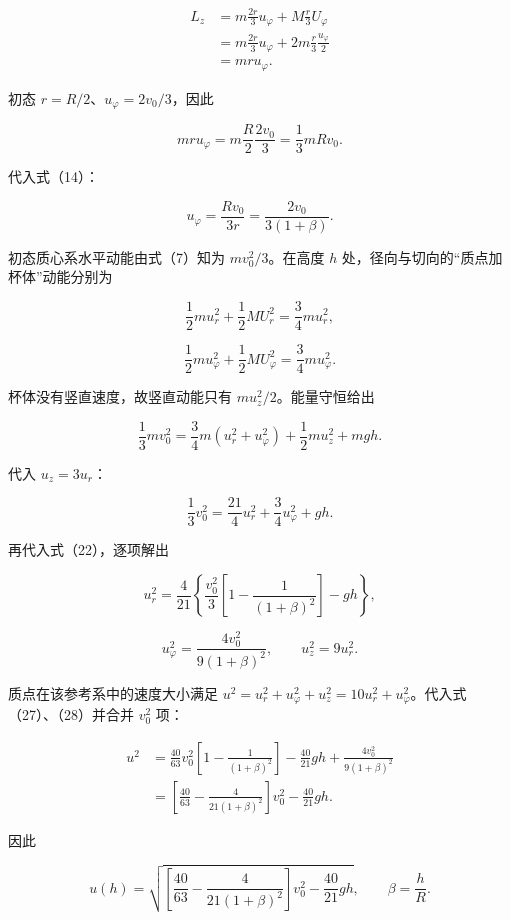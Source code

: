 \documentclass[12pt,a4paper,UTF8]{ctexart}
\begin{document}
\[
\begin{aligned}
L_z
&=m\frac{2r}{3}u_\varphi
+M\frac r3U_\varphi\\
&=m\frac{2r}{3}u_\varphi
+2m\frac r3\frac{u_\varphi}{2}\\
&=mru_\varphi.
\end{aligned}
\tag{20}
\]

初态 \(r=R/2\)、\(u_\varphi=2v_0/3\)，因此

\[
mr u_\varphi
=m\frac R2\frac{2v_0}{3}
=\frac13mRv_0.
\tag{21}
\]

代入式（14）：

\[
\boxed{
u_\varphi
=\frac{Rv_0}{3r}
=\frac{2v_0}{3(1+\beta)}
}.
\tag{22}
\]

初态质心系水平动能由式（7）知为 \(mv_0^2/3\)。在高度 \(h\)
处，径向与切向的``质点加杯体''动能分别为

\[
\frac12m u_r^2+\frac12M U_r^2
=\frac34m u_r^2,
\tag{23}
\]

\[
\frac12m u_\varphi^2+\frac12M U_\varphi^2
=\frac34m u_\varphi^2.
\tag{24}
\]

杯体没有竖直速度，故竖直动能只有 \(m u_z^2/2\)。能量守恒给出

\[
\frac13m v_0^2
=\frac34m(u_r^2+u_\varphi^2)
+\frac12m u_z^2+mgh.
\tag{25}
\]

代入 \(u_z=3u_r\)：

\[
\frac13v_0^2
=\frac{21}{4}u_r^2
+\frac34u_\varphi^2+gh.
\tag{26}
\]

再代入式（22），逐项解出

\[
\boxed{
u_r^2
=\frac4{21}\left\{
\frac{v_0^2}{3}\left[1-\frac1{(1+\beta)^2}\right]-gh
\right\}
},
\tag{27}
\]

\[
\boxed{
u_\varphi^2=\frac{4v_0^2}{9(1+\beta)^2}
},
\qquad
\boxed{u_z^2=9u_r^2}.
\tag{28}
\]

质点在该参考系中的速度大小满足
\(u^2=u_r^2+u_\varphi^2+u_z^2=10u_r^2+u_\varphi^2\)。代入式（27）、（28）并合并
\(v_0^2\) 项：

\[
\begin{aligned}
u^2
&=\frac{40}{63}v_0^2
\left[1-\frac1{(1+\beta)^2}\right]
-\frac{40}{21}gh
+\frac{4v_0^2}{9(1+\beta)^2}\\
&=\left[
\frac{40}{63}-\frac{4}{21(1+\beta)^2}
\right]v_0^2
-\frac{40}{21}gh.
\end{aligned}
\tag{29}
\]

因此

\[
\boxed{
u(h)=
\sqrt{
\left[
\frac{40}{63}
-\frac{4}{21(1+\beta)^2}
\right]v_0^2
-\frac{40}{21}gh
},
\qquad
\beta=\frac hR
}.
\tag{30}
\]
\end{document}
